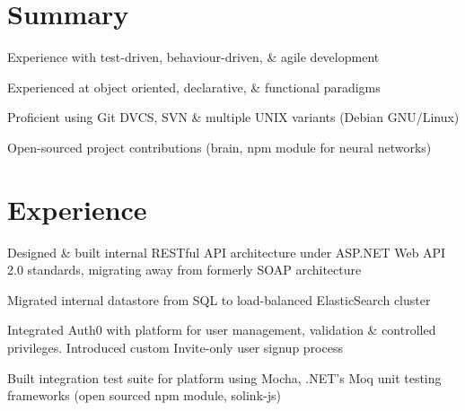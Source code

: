 ﻿\documentclass[letterpaper]{deedy-resume} %
\begin{document}
\begin{minipage}[t]{0.66\textwidth} %

        \section{Summary}
        \vspace{\topsep} %
        \begin{tightitemize}
                \item Experience with test-driven, behaviour-driven, \& agile development
                \item Experienced at object oriented, declarative, \& functional paradigms
                \item Proficient using Git DVCS, SVN \& multiple UNIX variants (Debian GNU/Linux)
                \item Open-sourced project contributions (brain, npm module for neural networks)
        \end{tightitemize}


        \section{Experience}


        \begin{tightitemize}
                \item Designed \& built internal RESTful API architecture under ASP.NET Web API 2.0 standards, migrating away from formerly SOAP architecture
                \item Migrated internal datastore from SQL to load-balanced ElasticSearch cluster
                \item Integrated Auth0 with platform for user management, validation \& controlled privileges. Introduced custom Invite-only user signup process
                \item Built integration test suite for platform using Mocha, .NET's Moq unit testing frameworks (open sourced npm module, solink-js) 


\end{tightitemize}
\end{minipage}
\end{document}
